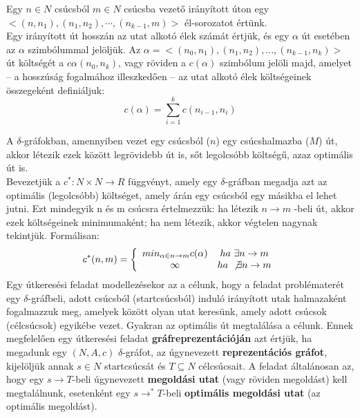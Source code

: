 \documentclass[12pt,margin=0px]{article}
\begin{document}
    {\footnotesize
    \noindent Egy $n \in N$ csúcsból $m \in N$ csúcsba vezető irányított úton egy $<(n,n_1), (n_1,n_2), \cdots , (n_{k-1},m)>$ él-sorozatot értünk.
    }\\

    {\footnotesize
    \noindent Egy irányított út hosszán az utat alkotó élek számát értjük, és egy $\alpha$ út esetében az $\alpha$ szimbólummal jelöljük. Az $\alpha = <(n_0,n_1), (n_1,n_2), ... , (n_{k-1},n_k)>$ út költségét a $c\alpha(n_0,n_k)$, vagy röviden a $c(\alpha)$ szimbólum jelöli majd, amelyet – a hosszúság fogalmához illeszkedően – az utat alkotó élek költségeinek összegeként definiáljuk:
    }
    \[
        c(\alpha) = \sum_{i=1}^{k}c(n_{i-1},n_{i})
    \]

    {\footnotesize
    \noindent A $\delta$-gráfokban, amennyiben vezet egy csúcsból ($n$) egy csúcshalmazba ($M$) út, akkor létezik ezek között legrövidebb út is, sőt legolcsóbb költségű, azaz optimális út is.
    }\\

    {\footnotesize
    \noindent Bevezetjük a $c^{*}:N \times N \rightarrow R$ függvényt, amely egy $\delta$-gráfban megadja azt az optimális (legolcsóbb) költséget, amely árán egy csúcsból egy másikba el lehet jutni. Ezt mindegyik n és m csúcsra értelmezzük: ha létezik { $n \rightarrow m$ }-beli út, akkor ezek költségeinek minimumaként; ha nem létezik, akkor végtelen nagynak tekintjük. Formálisan:
    }
    \[
        c^{*}(n, m) = \left\{ \begin{array}{cc}
                               min_{\alpha \in {n \rightarrow m}}c(\alpha) & ha\ \exists n \rightarrow m \\
                               \infty & ha\ \not\exists n \rightarrow m
                             \end{array}
         \right.
    \]
    {\footnotesize
    \noindent Egy útkeresési feladat modellezésekor az a célunk, hogy a feladat problématerét egy $\delta$-gráfbeli, adott csúcsból (startcsúcsból) induló irányított utak halmazaként fogalmazzuk meg, amelyek között olyan utat keresünk, amely adott csúcsok (célcsúcsok) egyikébe vezet. Gyakran az optimális út megtalálása a célunk. Ennek megfelelően egy útkeresési feladat \textbf{gráfreprezentációján} azt értjük, ha megadunk egy $(N,A,c)$ $\delta$-gráfot, az úgynevezett \textbf{reprezentációs gráfot}, kijelöljük annak $s \in N$ startcsúcsát és $T \subseteq N$ célcsúcsait. A feladat általánosan az, hogy egy $s \rightarrow T$-beli úgynevezett \textbf{megoldási utat} (vagy röviden megoldást) kell megtalálnunk, esetenként egy $s \rightarrow^{*}T$-beli \textbf{optimális megoldási utat} (az optimális megoldást).}\\
    \noindent {\footnotesize $\triangleleft$ \faLightbulbO }
\end{document}
